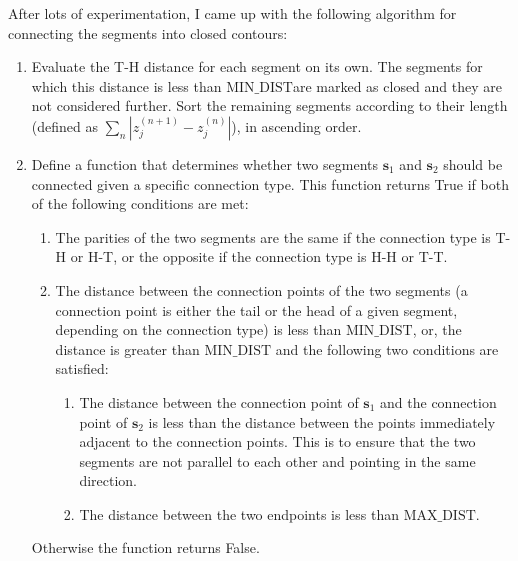 \documentclass[12pt,dvipsnames]{report}
\newcommand{\ssf}[1]{\textsf{#1}}
\begin{document}
After lots of experimentation,
I came up with the following algorithm for connecting the segments into closed contours:
\begin{enumerate}
    \item Evaluate the T-H distance for each segment on its own. The segments for which
    this distance is less than $\text{MIN\_DIST}$are marked as closed and they are not 
    considered further. Sort the remaining segments according to  their length (defined as 
    $\sum_n \left|z^{(n+1)}_j - z^{(n)}_j \right|$), in ascending order. 
    \item Define a function that determines whether two segments $\mathbf{s}_1$ and 
    $\mathbf{s}_2$ should be connected given a specific connection type. This function
    returns \ssf{True} if both of the following conditions are met:
    \begin{enumerate}
        \item The parities of the two segments are the same if the connection type is T-H or H-T, or 
        the opposite if the connection type is H-H or T-T.
        \item The distance between the connection points
        of the two segments (a connection point is either the tail or the head of a given segment,
        depending on the connection type) is less than $\text{MIN\_DIST}$, or, the distance
        is greater than $\text{MIN\_DIST}$ and the following two conditions are satisfied:
        \begin{enumerate}
        \item The distance between the connection point of $\mathbf{s}_1$ and the connection 
        point of $\mathbf{s}_2$ is less than the distance between the points 
        immediately adjacent to the connection points. This is to ensure that the two 
        segments are not parallel to each other and pointing in the same direction.
        \item The distance between the two endpoints is less than $\text{MAX\_DIST}$.
        \end{enumerate}
            \end{enumerate}
    Otherwise the function returns \ssf{False}.


\end{enumerate}
\end{document}
